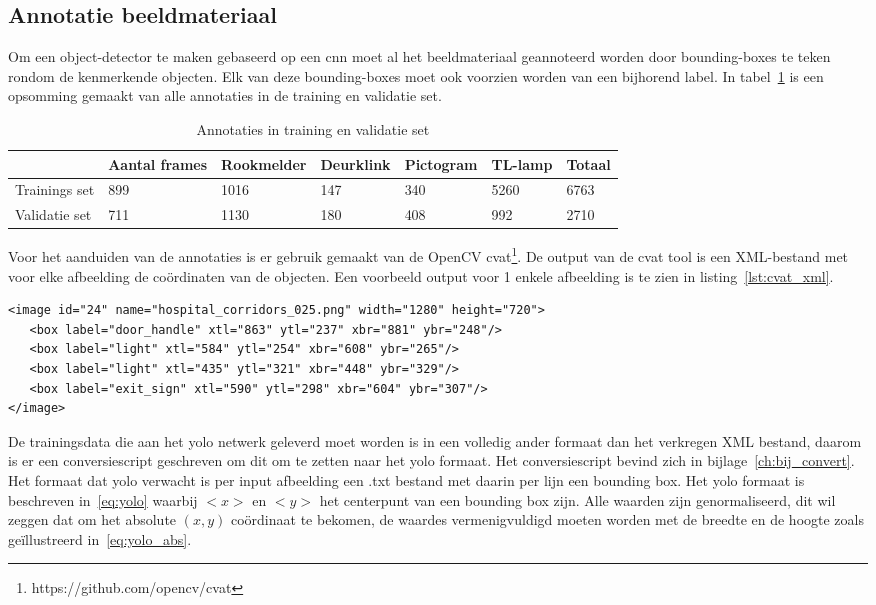 \subsection{Annotatie beeldmateriaal}
Om een object-detector te maken gebaseerd op een \gls{cnn} moet al het beeldmateriaal geannoteerd worden door bounding-boxes te teken rondom de kenmerkende objecten.
Elk van deze bounding-boxes moet ook voorzien worden van een bijhorend label. In tabel~\ref{tab:annotaties} is een opsomming gemaakt van alle annotaties in de training en validatie set.

\begin{table}[h]
    \caption{Annotaties in training en validatie set}\label{tab:annotaties}
    \begin{tabular}{l | l | l | l | l | l | l}
        & Aantal frames & Rookmelder & Deurklink & Pictogram & TL-lamp & Totaal \\ \hline
        Trainings set & 899 & 1016 & 147 & 340 & 5260 & 6763 \\
        Validatie set & 711 & 1130 & 180 & 408 & 992 & 2710 \\
    \end{tabular}
\end{table}

Voor het aanduiden van de annotaties is er gebruik gemaakt van de OpenCV \gls{cvat}\footnote{https://github.com/opencv/cvat}.
De output van de \gls{cvat} tool is een XML-bestand met voor elke afbeelding de co\"{o}rdinaten van de objecten. Een voorbeeld output voor 1 enkele afbeelding is te zien in listing~\ref{lst:cvat_xml}.

   \begin{lstlisting}[basicstyle=\small]
<image id="24" name="hospital_corridors_025.png" width="1280" height="720">
   <box label="door_handle" xtl="863" ytl="237" xbr="881" ybr="248"/>
   <box label="light" xtl="584" ytl="254" xbr="608" ybr="265"/>
   <box label="light" xtl="435" ytl="321" xbr="448" ybr="329"/>
   <box label="exit_sign" xtl="590" ytl="298" xbr="604" ybr="307"/>
</image>
   \end{lstlisting}

De trainingsdata die aan het \gls{yolo} netwerk geleverd moet worden is in een volledig ander formaat dan het verkregen XML bestand, daarom is er een conversiescript geschreven om dit om te zetten naar het \gls{yolo} formaat.
Het conversiescript bevind zich in bijlage~\ref{ch:bij_convert}.
Het formaat dat \gls{yolo} verwacht is per input afbeelding een .txt bestand met daarin per lijn een bounding box. Het \gls{yolo} formaat is beschreven in~\ref{eq:yolo} waarbij $<x>$ en $<y>$ het centerpunt van een bounding box zijn.
Alle waarden zijn genormaliseerd, dit wil zeggen dat om het absolute $(x, y)$ co\"{o}rdinaat te bekomen, de waardes vermenigvuldigd moeten worden met de breedte en de hoogte zoals ge\"{i}llustreerd in~\ref{eq:yolo_abs}.

